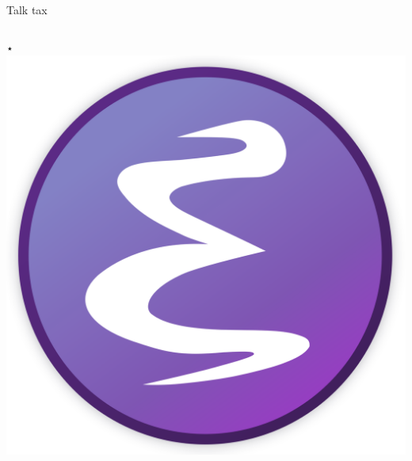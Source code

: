 \documentclass[bigger]{beamer}
\begin{document}
\begin{frame}[label={sec:org2de4fed}]{Talk tax}
\begin{columns}
\begin{column}{0.45\columnwidth}
\begin{block}{⋆}
\includegraphics[height=0.35\textheight]{images/emacs_logo.png}
\end{block}
\end{column}
\end{columns}
\end{frame}
\end{document}
